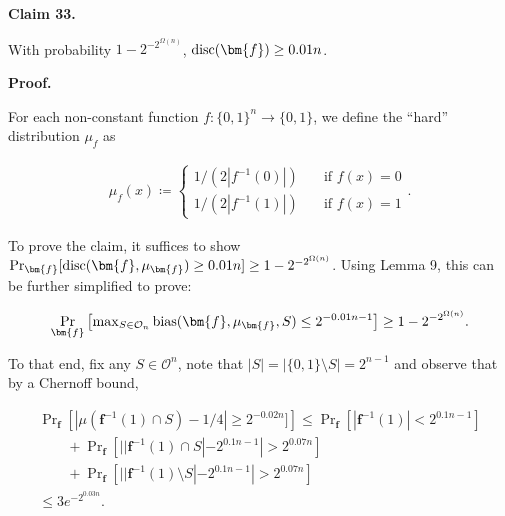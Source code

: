 

\par\medskip\noindent\textbf{
Claim 33. 
}\par



With probability $1-2^{-2^{\Omega(n)}}$, ${\textup{disc}}(\bm{f})\geq 0.01n$.\par







\par\medskip\noindent\textbf{
\textbf{Proof}.}\par




For each non-constant function $f:\{0,1\}^{n}\to\{0,1\}$, we define the “hard” distribution $\mu_{f}$ as\par


\[\begin{gathered}
\mu_{f}(x)\coloneqq\begin{cases}1/(2|f^{-1}(0)|)&\quad\text{if $f(x)=0$}\\
1/(2|f^{-1}(1)|)&\quad\text{if $f(x)=1$}\end{cases}.
\end{gathered}\]


To prove the claim, it suffices to show $\Pr_{\bm{f}}[{\textup{disc}}(\bm{f},\mu_{\bm{f}})\geq 0.01n]\geq 1-2^{-2^{\Omega(n)}}$. Using Lemma 9, this can be further simplified to prove:\par


\[\begin{gathered}
\Pr_{\bm{f}}\left[\max\nolimits_{S\in\mathcal{O}_{n}}{\textup{bias}}(\bm{f},\mu_{\bm{f}},S)\leq 2^{-0.01n-1}\right]\geq 1-2^{-2^{\Omega(n)}}.
\end{gathered}\]


To that end, fix any $S\in\mathcal{O}^{n}$, note that $|S|=|\{0,1\}\setminus S|=2^{n-1}$ and observe that by a Chernoff bound,\par


\[\begin{gathered}
\displaystyle\Pr\nolimits_{\bm{f}}\left[|\mu(\bm{f}^{-1}(1)\cap S)-1/4|\geq 2^{-0.02n}]\right] \displaystyle\leq\Pr\nolimits_{\bm{f}}\left[|\bm{f}^{-1}(1)|<2^{0.1n-1}\right] \\
\displaystyle\quad\quad+\Pr\nolimits_{\bm{f}}\left[||\bm{f}^{-1}(1)\cap S|-2^{0.1n-1}|>2^{0.07n}\right] \\
\displaystyle\quad\quad+\Pr\nolimits_{\bm{f}}\left[||\bm{f}^{-1}(1)\setminus S|-2^{0.1n-1}|>2^{0.07n}\right] \\
\displaystyle\leq 3e^{-2^{0.03n}}.
\end{gathered}\]


